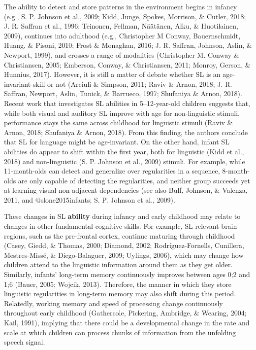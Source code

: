 \documentclass[man,mask,floatsintext]{apa6}
\begin{document}
The ability to detect and store patterns in the environment begins in
infancy (e.g., S. P. Johnson et al., 2009; Kidd, Junge, Spokes,
Morrison, \& Cutler, 2018; J. R. Saffran et al., 1996; Teinonen,
Fellman, Näätänen, Alku, \& Huotilainen, 2009), continues into adulthood
(e.g., Christopher M Conway, Bauernschmidt, Huang, \& Pisoni, 2010;
Frost \& Monaghan, 2016; J. R. Saffran, Johnson, Aslin, \& Newport,
1999), and crosses a range of modalities (Christopher M. Conway \&
Christiansen, 2005; Emberson, Conway, \& Christiansen, 2011; Monroy,
Gerson, \& Hunnius, 2017). However, it is still a matter of debate
whether SL is an age-invariant skill or not (Arciuli \& Simpson, 2011;
Raviv \& Arnon, 2018; J. R. Saffran, Newport, Aslin, Tunick, \&
Barrueco, 1997; Shufaniya \& Arnon, 2018). Recent work that investigates
SL abilities in 5--12-year-old children suggests that, while both visual
and auditory SL improve with age for non-linguistic stimuli, performance
stays the same across childhood for linguistic stimuli (Raviv \& Arnon,
2018; Shufaniya \& Arnon, 2018). From this finding, the authors conclude
that SL for language might be age-invariant. On the other hand, infant
SL abilities do appear to shift within the first year, both for
linguistic (Kidd et al., 2018) and non-linguistic (S. P. Johnson et al.,
2009) stimuli. For example, while 11-month-olds can detect and
generalize over regularities in a sequence, 8-month-olds are only
capable of detecting the regularities, and neither group succeeds yet at
learning visual non-adjacent dependencies (see also Bulf, Johnson, \&
Valenza, 2011, and @slone2015infants; S. P. Johnson et al., 2009).

These changes in SL \textbf{ability} during infancy and early childhood
may relate to changes in other fundamental cognitive skills. For
example, SL-relevant brain regions, such as the pre-frontal cortex,
continue maturing through childhood (Casey, Giedd, \& Thomas, 2000;
Diamond, 2002; Rodríguez-Fornells, Cunillera, Mestres-Missé, \&
Diego-Balaguer, 2009; Uylings, 2006), which may change how children
attend to the linguistic information around them as they get older.
Similarly, infants' long-term memory continuously improves between ages
0;2 and 1;6 (Bauer, 2005; Wojcik, 2013). Therefore, the manner in which
they store linguistic regularities in long-term memory may also shift
during this period. Relatedly, working memory and speed of processing
change continuously throughout early childhood (Gathercole, Pickering,
Ambridge, \& Wearing, 2004; Kail, 1991), implying that there could be a
developmental change in the rate and scale at which children can process
chunks of information from the unfolding speech signal.
\end{document}
